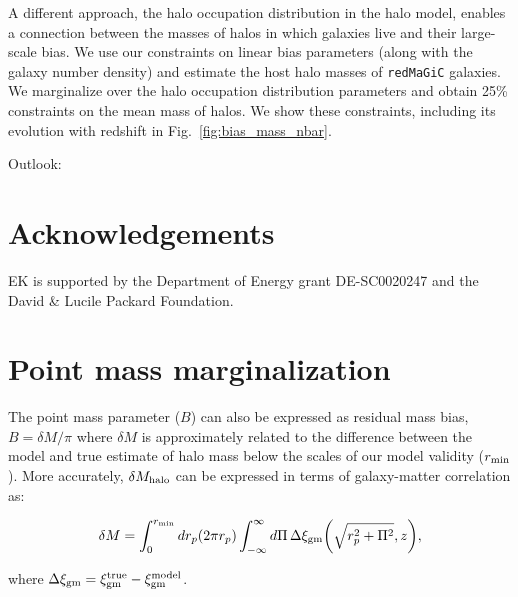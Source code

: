 \documentclass[aps, prd,twocolumn,superscriptaddress,nofootinbib,preprintnumbers]{revtex4-1}
\newcommand{\redmagic}{\texttt{redMaGiC} }
\begin{document}
A different approach, the halo occupation distribution in the halo model, enables a connection between the masses of halos in which galaxies live and their large-scale bias. We use our constraints on linear bias parameters (along with the galaxy number density) and estimate the host halo masses of \redmagic galaxies. We marginalize over the halo occupation distribution parameters and obtain 25\% constraints on the mean mass of halos. We show these constraints, including its evolution with redshift in Fig.~\ref{fig:bias_mass_nbar}.

Outlook: 


\section*{Acknowledgements}
EK is supported by the Department of Energy grant DE-SC0020247 and the David \& Lucile Packard Foundation.













\appendix



\section{Point mass marginalization}
\label{app:pm}
The point mass parameter ($B$) can also be expressed as residual mass bias, $B = \delta M/\pi$ where $\delta M$ is approximately related to the difference between the model and true estimate of halo mass below the scales of our model validity ($r_{\rm min}$). More accurately, $\delta M_{\rm halo}$ can be expressed in terms of galaxy-matter correlation as:
\begin{linenomath*}
\begin{equation}
\label{eq:pm_halo}
    \delta M = \int_{0}^{r_{\rm min}} dr_p (2\pi r_p) \int_{-\infty}^{\infty} d\Pi \, \Delta \xi_{\rm gm}\bigg(\sqrt{r_p^2 + \Pi^2}, z \bigg), 
\end{equation}
\end{linenomath*}
where $\Delta \xi_{\rm gm} = \xi^{\rm true}_{\rm gm} - \xi^{\rm model}_{\rm gm}$.
\end{document}
